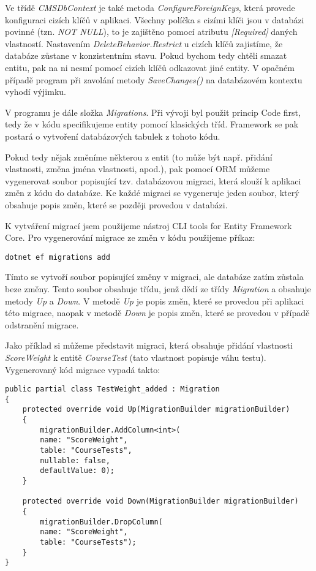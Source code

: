 Ve třídě \textit{CMSDbContext} je také metoda \textit{ConfigureForeignKeys}, která provede konfiguraci cizích klíčů v aplikaci. Všechny políčka s cizími klíči jsou v databázi povinné (tzn. \textit{NOT NULL}), to je zajištěno pomocí atributu \textit{[Required]} daných vlastností. Nastavením \textit{DeleteBehavior.Restrict} u cizích klíčů zajistíme, že databáze zůstane v konzistentním stavu. Pokud bychom tedy chtěli smazat entitu, pak na ni nesmí pomocí cizích klíčů odkazovat jiné entity. V opačném případě program při zavolání metody \textit{SaveChanges()} na databázovém kontextu vyhodí výjimku.

V programu je dále složka \textit{Migrations}. Při vývoji byl použit princip Code first, tedy že v kódu specifikujeme entity pomocí klasických tříd. Framework se pak postará o vytvoření databázových tabulek z tohoto kódu.

Pokud tedy nějak změníme některou z entit (to může být např. přidání vlastnosti, změna jména vlastnosti, apod.), pak pomocí ORM můžeme vygenerovat soubor popisující tzv. databázovou migraci, která slouží k aplikaci změn z kódu do databáze. Ke každé migraci se vygeneruje jeden soubor, který obsahuje popis změn, které se později provedou v databázi.

K vytváření migrací jsem použijeme nástroj CLI tools for Entity Framework Core. \cite{EfCoreCliDocs} Pro vygenerování migrace ze změn v kódu použijeme příkaz:

\begin{lstlisting}
dotnet ef migrations add 
\end{lstlisting}

Tímto se vytvoří soubor popisující změny v migraci, ale databáze zatím zůstala beze změny. Tento soubor obsahuje třídu, jenž dědí ze třídy \textit{Migration} a obsahuje metody \textit{Up} a \textit{Down}. V metodě \textit{Up} je popis změn, které se provedou při aplikaci této migrace, naopak v metodě \textit{Down} je popis změn, které se provedou v případě odstranění migrace.

Jako příklad si můžeme představit migraci, která obsahuje přidání vlastnosti \textit{ScoreWeight} k entitě \textit{CourseTest} (tato vlastnost popisuje váhu testu).
Vygenerovaný kód migrace vypadá takto:

\begin{lstlisting}
public partial class TestWeight_added : Migration
{
	protected override void Up(MigrationBuilder migrationBuilder)
	{
		migrationBuilder.AddColumn<int>(
		name: "ScoreWeight",
		table: "CourseTests",
		nullable: false,
		defaultValue: 0);
	}
	
	protected override void Down(MigrationBuilder migrationBuilder)
	{
		migrationBuilder.DropColumn(
		name: "ScoreWeight",
		table: "CourseTests");
	}
}
\end{lstlisting}

